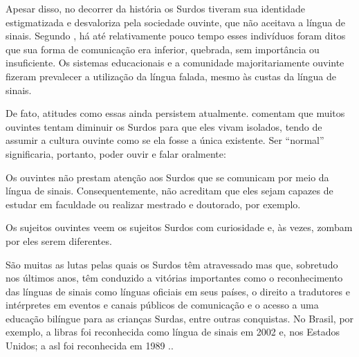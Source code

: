 

Apesar disso, no decorrer da história os Surdos tiveram sua identidade estigmatizada e desvaloriza pela sociedade ouvinte, que não aceitava a língua de sinais. Segundo , há até relativamente pouco tempo esses indivíduos foram ditos que sua forma de comunicação era inferior, quebrada, sem importância ou insuficiente. Os sistemas educacionais e a comunidade majoritariamente ouvinte fizeram prevalecer a utilização da língua falada, mesmo às custas da língua de sinais.

De fato, atitudes como essas ainda persistem atualmente.  comentam que muitos ouvintes tentam  diminuir os Surdos para que eles vivam isolados, tendo de assumir a cultura ouvinte como se ela fosse a única existente. Ser ``normal'' significaria, portanto, poder ouvir e falar oralmente:


\begin{citacao}
    Os ouvintes não prestam atenção aos Surdos que se comunicam por meio da língua de sinais. Consequentemente, não acreditam que eles sejam capazes de estudar em faculdade ou realizar mestrado e  doutorado, por exemplo. \cite{pereira-2011-conhecimento-alem-sinais}
\end{citacao}

\begin{citacao}
    Os sujeitos ouvintes veem os sujeitos Surdos com curiosidade e, às vezes, zombam por eles serem diferentes. \cite{strobel-2016-cultura-surda}
\end{citacao}


São muitas as lutas pelas quais os Surdos têm atravessado mas que, sobretudo nos últimos anos, têm conduzido a vitórias importantes como o reconhecimento das línguas de sinais como línguas oficiais em seus países, o direito a tradutores e intérpretes em eventos e canais públicos de comunicação e o acesso a uma educação bilíngue para as crianças Surdas, entre outras conquistas. No Brasil, por exemplo, a \acrshort{libras} foi reconhecida como língua de sinais em 2002 \cite{brasil-2002-lei10436} e, nos Estados Unidos; a \acrshort{asl} foi reconhecida em 1989 \cite{pereira-2011-conhecimento-alem-sinais, jay-2011-dont-just-sign}..

